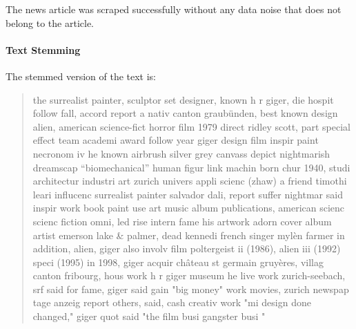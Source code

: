 The news article was scraped successfully without any data noise that does not belong to the article.

\paragraph{Text Stemming}
The stemmed version of the text is:
\begin{quote}
    the surrealist painter, sculptor set designer, known h r giger, die hospit follow fall,
    accord report a nativ canton graubünden, best known design alien,
    american science-fict horror film 1979 direct ridley scott,
    part special effect team academi award follow year giger design film inspir paint necronom
    iv he known airbrush silver grey canvass depict nightmarish dreamscap “biomechanical”
    human figur link machin born chur 1940, studi architectur industri art zurich univers appli scienc (zhaw)
    a friend timothi leari influcenc surrealist painter salvador dali, report suffer nightmar said
    inspir work book paint use art music album publications, american scienc scienc fiction omni,
    led rise intern fame his artwork adorn cover album artist emerson lake \& palmer, dead kennedi
    french singer mylèn farmer in addition, alien, giger also involv film poltergeist ii (1986),
    alien iii (1992) speci (1995) in 1998, giger acquir château st germain gruyères, villag canton fribourg,
    hous work h r giger museum he live work zurich-seebach, srf said for fame, giger said gain "big money"
    work movies, zurich newspap tage anzeig report others, said, cash creativ work "mi design done changed,"
    giger quot said "the film busi gangster busi "
\end{quote}

